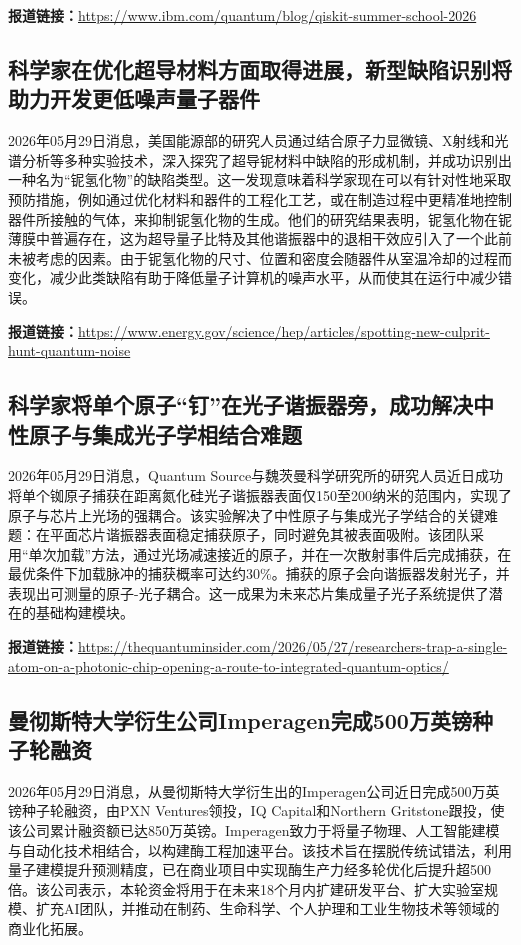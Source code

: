 \documentclass[12pt,a4paper]{ctexart}
\begin{document}
\noindent\textbf{报道链接：}\url{https://www.ibm.com/quantum/blog/qiskit-summer-school-2026}

\subsection{ 科学家在优化超导材料方面取得进展，新型缺陷识别将助力开发更低噪声量子器件 }

2026年05月29日消息，美国能源部的研究人员通过结合原子力显微镜、X射线和光谱分析等多种实验技术，深入探究了超导铌材料中缺陷的形成机制，并成功识别出一种名为“铌氢化物”的缺陷类型。这一发现意味着科学家现在可以有针对性地采取预防措施，例如通过优化材料和器件的工程化工艺，或在制造过程中更精准地控制器件所接触的气体，来抑制铌氢化物的生成。他们的研究结果表明，铌氢化物在铌薄膜中普遍存在，这为超导量子比特及其他谐振器中的退相干效应引入了一个此前未被考虑的因素。由于铌氢化物的尺寸、位置和密度会随器件从室温冷却的过程而变化，减少此类缺陷有助于降低量子计算机的噪声水平，从而使其在运行中减少错误。

\noindent\textbf{报道链接：}\url{https://www.energy.gov/science/hep/articles/spotting-new-culprit-hunt-quantum-noise}

\subsection{ 科学家将单个原子“钉”在光子谐振器旁，成功解决中性原子与集成光子学相结合难题 }

2026年05月29日消息，Quantum Source与魏茨曼科学研究所的研究人员近日成功将单个铷原子捕获在距离氮化硅光子谐振器表面仅150至200纳米的范围内，实现了原子与芯片上光场的强耦合。该实验解决了中性原子与集成光子学结合的关键难题：在平面芯片谐振器表面稳定捕获原子，同时避免其被表面吸附。该团队采用“单次加载”方法，通过光场减速接近的原子，并在一次散射事件后完成捕获，在最优条件下加载脉冲的捕获概率可达约30\%。捕获的原子会向谐振器发射光子，并表现出可测量的原子-光子耦合。这一成果为未来芯片集成量子光子系统提供了潜在的基础构建模块。

\noindent\textbf{报道链接：}\url{https://thequantuminsider.com/2026/05/27/researchers-trap-a-single-atom-on-a-photonic-chip-opening-a-route-to-integrated-quantum-optics/}

\subsection{ 曼彻斯特大学衍生公司Imperagen完成500万英镑种子轮融资 }

2026年05月29日消息，从曼彻斯特大学衍生出的Imperagen公司近日完成500万英镑种子轮融资，由PXN Ventures领投，IQ Capital和Northern Gritstone跟投，使该公司累计融资额已达850万英镑。Imperagen致力于将量子物理、人工智能建模与自动化技术相结合，以构建酶工程加速平台。该技术旨在摆脱传统试错法，利用量子建模提升预测精度，已在商业项目中实现酶生产力经多轮优化后提升超500倍。该公司表示，本轮资金将用于在未来18个月内扩建研发平台、扩大实验室规模、扩充AI团队，并推动在制药、生命科学、个人护理和工业生物技术等领域的商业化拓展。
\end{document}
